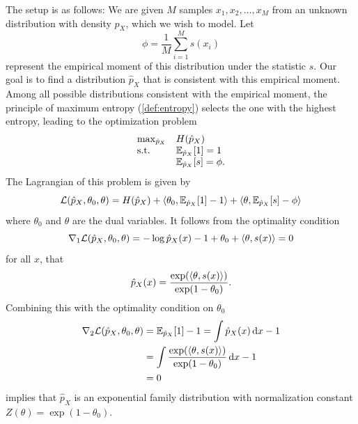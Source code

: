 The setup is as follows:
We are given \( M \) samples \( x_{\num{1}}, x_{\num{2}}, \dotsc, x_M \) from an unknown distribution with density \( p_X \), which we wish to model.
Let
\begin{equation}
	\phi = \frac{1}{M} \sum_{i=\num{1}}^M s(x_i)
\end{equation}
represent the empirical moment of this distribution under the statistic \( s \).
Our goal is to find a distribution \( \hat{p}_X \) that is consistent with this empirical moment.
Among all possible distributions consistent with the empirical moment, the principle of maximum entropy (\cref{def:entropy}) selects the one with the highest entropy, leading to the optimization problem
\begin{equation}
    \begin{array}{ll}
		\max_{\hat{p}_X}   & H(\hat{p}_X) \\
		\mbox{s.t.} & \mathbb{E}_{\hat{p}_X}[\num{1}] = \num{1} \\
					& \mathbb{E}_{\hat{p}_X}[s] = \phi.
    \end{array}
    \label{eq:maxent}
\end{equation}
The Lagrangian of this problem is given by
\begin{equation}
	\mathcal{L}(\hat{p}_X, \theta_{\num{0}}, \theta) = H(\hat{p}_X) + \langle \theta_{\num{0}}, \mathbb{E}_{\hat{p}_X}[\num{1}] - \num{1} \rangle + \langle \theta, \mathbb{E}_{\hat{p}_X}[s] - \phi \rangle
\end{equation}
where \( \theta_{\num{0}} \) and \( \theta \) are the dual variables.
It follows from the optimality condition
\begin{equation}
	\nabla_{\num{1}} \mathcal{L}(\hat{p}_X, \theta_{\num{0}}, \theta) = -\log \hat{p}_X(x) - \num{1} + \theta_{\num{0}} + \langle \theta, s(x) \rangle = \num{0}
\end{equation}
for all \( x \), that
\begin{equation}
	\hat{p}_X(x) = \frac{\exp(\langle \theta, s(x) \rangle)}{\exp(\num{1} - \theta_{\num{0}})}.
\end{equation}
Combining this with the optimality condition on \( \theta_{\num{0}} \)
\begin{equation}
	\begin{aligned}
		\nabla_{\num{2}} \mathcal{L}(\hat{p}_X, \theta_{\num{0}}, \theta) &= \mathbb{E}_{\hat{p}_X}[\num{1}] - \num{1} = \int \hat{p}_{X}(x)\,\mathrm{d}x - \num{1}\\
																  &= \int \frac{\exp(\langle \theta, s(x) \rangle)}{\exp(\num{1} - \theta_{\num{0}})}\,\mathrm{d}x - \num{1} \\
														  &= \num{0}
	\end{aligned}
\end{equation}
implies that \( \hat{p}_X \) is an exponential family distribution with normalization constant \( Z(\theta) = \exp(\num{1} - \theta_{\num{0}}) \).

